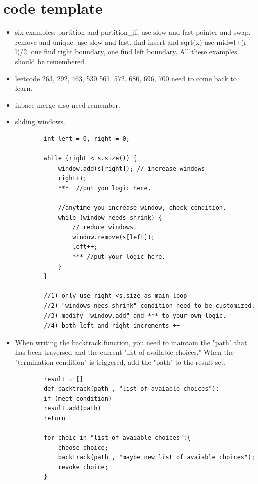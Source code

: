 \documentclass[a4paper,11pt,twoside]{book}
\begin{document}
\section{code template}
\begin{itemize}
	
	\item six examples: partition and partition\_if, use slow and fast pointer and swap.  remove and unique. use slow and fast. find insert and sqrt(x) use mid=l+(r-l)/2.  one find right boundary, one find left boundary.  All these examples should be remembered. 
	
	\item leetcode 263, 292, 463, 530 561, 572. 680, 696, 700 need to come back to learn.
	
	\item inpace merge also need remember. 
	
	\item sliding windows. 
	
	\begin{lstlisting}
		int left = 0, right = 0;
		
		while (right < s.size()) {
			window.add(s[right]); // increase windows
			right++;
			***  //put you logic here.
			
			//anytime you increase window, check condition. 
			while (window needs shrink) {
				// reduce windows.
				window.remove(s[left]);
				left++;
				*** //put your logic here. 
			}
		}
		
		//1) only use right <s.size as main loop
		//2) "windows nees shrink" condition need to be customized. 
		//3) modify "window.add" and *** to your own logic. 
		//4) both left and right increments ++
	\end{lstlisting}
	
	\item When writing the backtrack function, you need to maintain the "path" that has been traversed and the current "list of available choices." When the "termination condition" is triggered, add the "path" to the result set.
	
	\begin{lstlisting}
		result = []
		def backtrack(path , "list of avaiable choices"):
		if (meet condition)
		result.add(path)
		return
		
		for choic in "list of avaiable choices":{
			choose choice;
			backtrack(path , "maybe new list of avaiable choices");
			revoke choice;
		}	
	\end{lstlisting}
	

\end{itemize}
\end{document}
